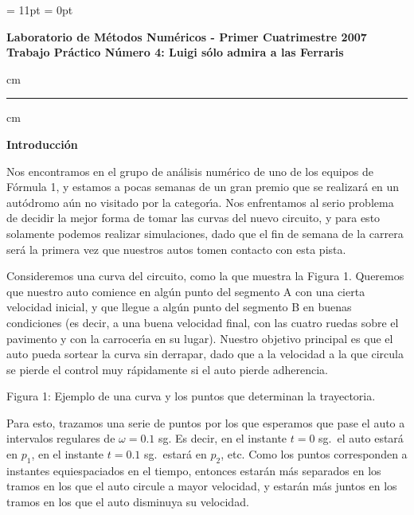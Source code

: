 \parskip = 11pt
\parindent = 0pt

\begin{centering}
\bf Laboratorio de M\'etodos Num\'ericos - Primer Cuatrimestre 2007 \\
\bf Trabajo Pr\'actico N\'umero 4: Luigi s\'olo admira a las Ferraris \\
\end{centering}

 cm
\hrule
{} cm

\textbf{Introducci\'on}

Nos encontramos en el grupo de an\'alisis num\'erico de uno de los equipos de
F\'ormula 1, y estamos a pocas semanas de un gran premio que se realizar\'a
en un aut\'odromo a\'un no visitado por la categor\'\i a. Nos enfrentamos
al serio problema de decidir la mejor forma de tomar las curvas del nuevo
circuito, y para esto solamente podemos realizar simulaciones, dado que
el fin de semana de la carrera ser\'a la primera vez que nuestros autos
tomen contacto con esta pista.

Consideremos una curva del circuito, como la que muestra la Figura 1.
Queremos que nuestro auto comience en alg\'un punto del segmento A con
una cierta velocidad inicial, y que llegue a alg\'un punto del segmento B en
buenas condiciones (es decir, a una buena velocidad final, con las cuatro
ruedas sobre el pavimento y con la carrocer\'\i a en su lugar). Nuestro
objetivo principal es que el auto pueda sortear la curva sin derrapar, dado
que a la velocidad a la que circula se pierde el control muy r\'apidamente
si el auto pierde adherencia.

\vskip 11pt

\begin{centering}

Figura 1: Ejemplo de una curva y los puntos que determinan la trayectoria. \\
\end{centering}

\vskip 11pt

Para esto, trazamos una serie de puntos por los que esperamos que pase
el auto a intervalos regulares de $\omega = 0.1$ sg. Es decir, en el
instante $t=0$ sg.~el auto estar\'a en $p_1$, en el instante
$t=0.1$ sg.~estar\'a en $p_2$, etc. Como los puntos corresponden a
instantes equiespaciados en el tiempo, entonces estar\'an m\'as separados
en los tramos en los que el auto circule a mayor velocidad, y estar\'an
m\'as juntos en los tramos en los que el auto disminuya su velocidad.


